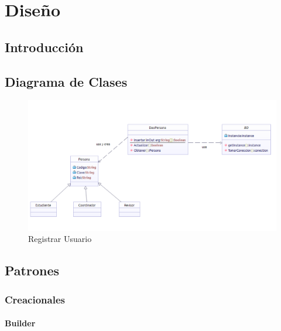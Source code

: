 \chapter{Diseño}

\section{Introducción}

\newpage



\section{Diagrama de Clases}

\begin{figure}[th!]
	\centering
	\includegraphics[width=1.2\linewidth]{uml/Clases/ClasesCrearUsuario}
	\caption{Registrar Usuario}
	\label{fig:Registrar Usuario}
\end{figure}

\newpage

\section{Patrones}

\subsection{Creacionales}

\bigskip

\subsubsection{Builder}

